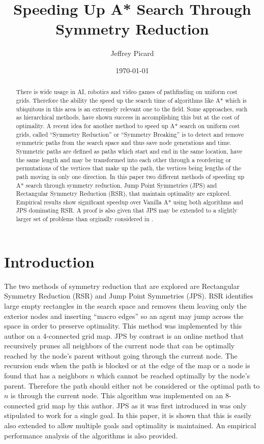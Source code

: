 \documentclass[12pt]{article}
\date{\small\today} \title{Speeding Up A* Search Through Symmetry Reduction} \author{Jeffrey Picard}
\begin{document}
\maketitle

\begin{abstract}
There is wide usage in AI, robotics and video games of pathfinding on uniform cost grids. Therefore the ability the speed up the search time of algorithms like A*
which is ubiquitous in this area is an extremely relevant one to the field. Some approaches, such as hierarchical methods, have shown success in accomplishing 
this but at the cost of optimality. A recent idea for another method to speed up A* search on uniform cost grids, called ``Symmetry Reduction'' or 
``Symmetry Breaking'' is to detect and remove symmetric paths from the search space and thus save node generations and time. Symmetric paths are defined as 
paths which start and end in the same location, have the same length and may be transformed into each other through a reordering or permutations of the 
vertices that make up the path, the vertices being lengths of the path moving in only one direction. In this paper two different methods of speeding up A* 
search through symmetry reduction, Jump Point Symmetries (JPS) and Rectangular Symmetry Reduction (RSR), that maintain optimality are explored. Empirical
results show significant speedup over Vanilla A* using both algorithms and JPS dominating RSR. A proof is also given that JPS may be extended to a slightly
larger set of problems than orginally considered in \cite{Har2011}.
\end{abstract}


\section{Introduction}
The two methods of symmetry reduction that are explored are Rectangular Symmetry Reduction (RSR) and Jump Point Symmetries (JPS)\cite{Har2011,Har2010}. 
RSR identifies large empty
rectangles in the search space and removes them leaving only the exterior nodes and inserting ``macro edges'' so an agent may jump across the space in 
order to preserve optimality. This method was implemented by this author on a 4-connected grid map. JPS by contrast is an online method that recursively prunes 
all neighbors of the current node that can be optimally reached by the node's parent without going through the current node. The recursion ends when the path 
is blocked or at the edge of the map or a node is found that has a neighbors $n$ which cannot be reached optimally by the node's parent. 
Therefore the path should either not be considered or the optimal path to $n$ is through the current node. This algorithm was implemented on an 8-connected
grid map by this author. JPS as it was first introduced in\cite{Har2011} was only stipulated to work for a single goal. In this paper, it is shown that this 
is easily also extended to allow multiple goals and optimality is maintained. An empirical performance analysis of the algorithms is also provided.
	
\end{document}
